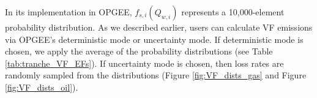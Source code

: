 \documentclass[11pt]{report}
\begin{document}
In its implementation in OPGEE, $f_{s,i}(Q_{w,i})$ represents a 10,000-element probability distribution. As we described earlier, users can calculate VF emissions via OPGEE's deterministic mode or uncertainty mode. If deterministic mode is chosen, we apply the average of the probability distributions (see Table \ref{tab:tranche_VF_EFs}). If uncertainty mode is chosen, then loss rates are randomly sampled from the distributions (Figure \ref{fig:VF_dists_gas} and Figure \ref{fig:VF_dists_oil}). 

\end{document}
